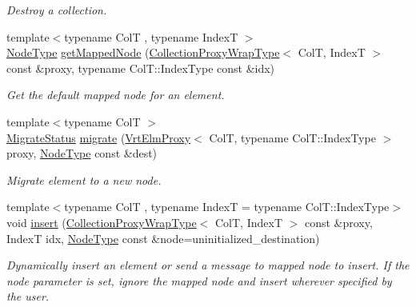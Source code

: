 \begin{DoxyCompactItemize}
\begin{DoxyCompactList}\small\item\em Destroy a collection. \end{DoxyCompactList}\item 
{\footnotesize template$<$typename ColT , typename IndexT $>$ }\\\hyperlink{namespacevt_a866da9d0efc19c0a1ce79e9e492f47e2}{Node\+Type} \hyperlink{structvt_1_1vrt_1_1collection_1_1_collection_manager_ae333912da83d9beac8b710ec98e53094}{get\+Mapped\+Node} (\hyperlink{structvt_1_1vrt_1_1collection_1_1_collection_manager_a56458ed7f9bb22b631b9b3a745f42f94}{Collection\+Proxy\+Wrap\+Type}$<$ ColT, IndexT $>$ const \&proxy, typename Col\+T\+::\+Index\+Type const \&idx)
\begin{DoxyCompactList}\small\item\em Get the default mapped node for an element. \end{DoxyCompactList}\item 
{\footnotesize template$<$typename ColT $>$ }\\\hyperlink{namespacevt_1_1vrt_1_1collection_ad221ad8aea9e586689b4335f5bcd9804}{Migrate\+Status} \hyperlink{structvt_1_1vrt_1_1collection_1_1_collection_manager_aa78b0230c093abfbfc42629f36047c52}{migrate} (\hyperlink{structvt_1_1vrt_1_1collection_1_1_vrt_elm_proxy}{Vrt\+Elm\+Proxy}$<$ ColT, typename Col\+T\+::\+Index\+Type $>$ proxy, \hyperlink{namespacevt_a866da9d0efc19c0a1ce79e9e492f47e2}{Node\+Type} const \&dest)
\begin{DoxyCompactList}\small\item\em Migrate element to a new node. \end{DoxyCompactList}\item 
{\footnotesize template$<$typename ColT , typename IndexT  = typename Col\+T\+::\+Index\+Type$>$ }\\void \hyperlink{structvt_1_1vrt_1_1collection_1_1_collection_manager_af7c0033bd57a7dbb3e70888e7fb2e1a9}{insert} (\hyperlink{structvt_1_1vrt_1_1collection_1_1_collection_manager_a56458ed7f9bb22b631b9b3a745f42f94}{Collection\+Proxy\+Wrap\+Type}$<$ ColT, IndexT $>$ const \&proxy, IndexT idx, \hyperlink{namespacevt_a866da9d0efc19c0a1ce79e9e492f47e2}{Node\+Type} const \&node=uninitialized\+\_\+destination)
\begin{DoxyCompactList}\small\item\em Dynamically insert an element or send a message to mapped node to insert. If the {\ttfamily node} parameter is set, ignore the mapped node and insert wherever specified by the user. \end{DoxyCompactList}\item 

\end{DoxyCompactItemize}
